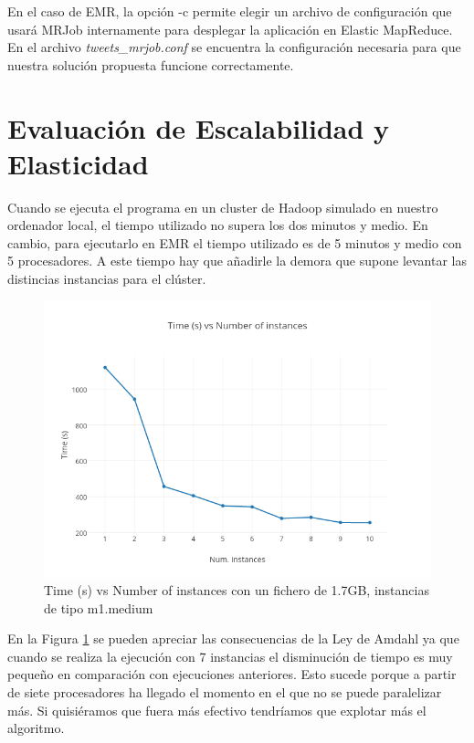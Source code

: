 \documentclass[12pt,a4paper]{article}
\begin{document}
En el caso de EMR, la opción -c permite elegir un archivo de configuración que usará MRJob internamente para desplegar la aplicación en Elastic MapReduce. En el archivo \textit{tweets\_mrjob.conf} se encuentra la configuración necesaria para que nuestra solución propuesta funcione correctamente.

\section{Evaluación de Escalabilidad y Elasticidad}

Cuando se ejecuta el programa en un cluster de Hadoop simulado en nuestro ordenador local, el tiempo  utilizado no supera los dos minutos y medio. En cambio, para ejecutarlo en EMR el tiempo utilizado es de 5 minutos y medio con 5 procesadores. A este tiempo hay que añadirle la demora que supone levantar las distincias instancias para el clúster. 

\begin{figure}[h]
\centering
\includegraphics[scale=0.5]{plot.png}
\caption{Time (s) vs Number of instances con un fichero de 1.7GB, instancias de tipo m1.medium}
\label{tiempos}
\end{figure}

En la Figura \ref{tiempos} se pueden apreciar las consecuencias de la Ley de Amdahl ya que cuando se realiza la ejecución con 7 instancias el disminución de tiempo es muy pequeño en comparación con ejecuciones anteriores. Esto sucede porque a partir de siete procesadores ha llegado el momento en el que no se puede paralelizar más. Si quisiéramos que fuera más efectivo tendríamos que explotar más el algoritmo.\\
\end{document}
